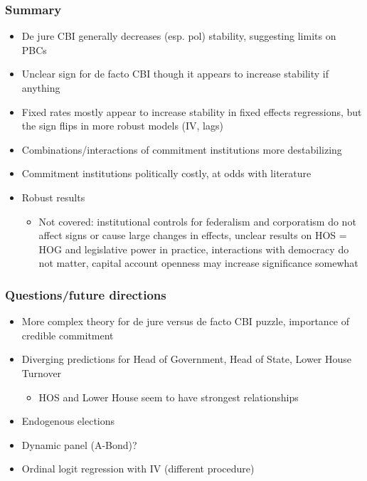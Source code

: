\documentclass{beamer}
\begin{document}
    \begin{frame}
        \frametitle{Summary}
        \begin{itemize}
            \item De jure CBI generally decreases (esp. pol) stability, suggesting limits on PBCs
            \item Unclear sign for de facto CBI though it appears to increase stability if anything
            \item Fixed rates mostly appear to increase stability in fixed effects regressions, but the sign flips in more robust models (IV, lags)
            \item Combinations/interactions of commitment institutions more destabilizing
            \item Commitment institutions politically costly, at odds with literature
            \item Robust results
            \begin{itemize}
                \item Not covered: institutional controls for federalism and corporatism do not affect signs or cause large changes in effects, unclear results on HOS = HOG and legislative power in practice, interactions with democracy do not matter, capital account openness may increase significance somewhat
            \end{itemize}
        \end{itemize}
    \end{frame}

    \begin{frame}
        \frametitle{Questions/future directions}
        \begin{itemize}
            \item More complex theory for de jure versus de facto CBI puzzle, importance of credible commitment
            \item Diverging predictions for Head of Government, Head of State, Lower House Turnover
            \begin{itemize}
                \item HOS and Lower House seem to have strongest relationships
            \end{itemize}
            \item Endogenous elections
            \item Dynamic panel (A-Bond)?
            \item Ordinal logit regression with IV (different procedure)
        \end{itemize}
    \end{frame}
\end{document}
